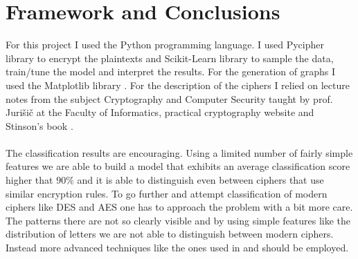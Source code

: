 \documentclass[a4paper]{article}
\begin{document}
\section{Framework and Conclusions} \label{frame_conclusion}
For this project I used the Python programming language. I used Pycipher library \cite{pycipher} to encrypt the plaintexts and Scikit-Learn library \cite{scikit-learn} to sample the data, train/tune the model and interpret the results. For the generation of graphs I used the Matplotlib library \cite{Hunter:2007}. For the description of the ciphers I relied on lecture notes from the subject Cryptography and Computer Security taught by prof. Jurišič at the Faculty of Informatics, practical cryptography website \cite{practicalCrypto} and Stinson's book \cite{stinson2005cryptography}.\\
\\
The classification results are encouraging. Using a limited number of fairly simple features we are able to build a model that exhibits an average classification score higher that $90\%$ and it is able to distinguish even between ciphers that use similar encryption rules. To go further and attempt classification of modern ciphers like DES and AES one has to approach the problem with a bit more care. The patterns there are not so clearly visible and by using simple features like the distribution of letters we are not able to distinguish between modern ciphers. Instead more advanced techniques like the ones used in \cite{sivagurunathan2010classification} and \cite{decipher} should be employed.



\end{document}
